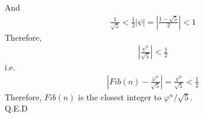 \documentclass{article}
\begin{document}
	\noindent
	And
	\begin{eqnarray}
		\frac1{\sqrt5}<\frac12
		\left|\psi\right|=\left|\frac{1-\sqrt5}2\right|<1
	\end{eqnarray}
	Therefore,
	\begin{eqnarray}
		\left|\frac{\psi^n}{\sqrt5}\right|<\frac12
	\end{eqnarray}
	i.e.
	\begin{eqnarray}
		\left|Fib(n)-\frac{\varphi^n}{\sqrt5}\right|=\frac{\psi^n}{\sqrt5}<\frac12
	\end{eqnarray}
	Therefore, $Fib(n)$ is the closest integer to $\varphi^{n} / \sqrt{5}$.\\
	
	\noindent
	Q.E.D

        
\end{document}
